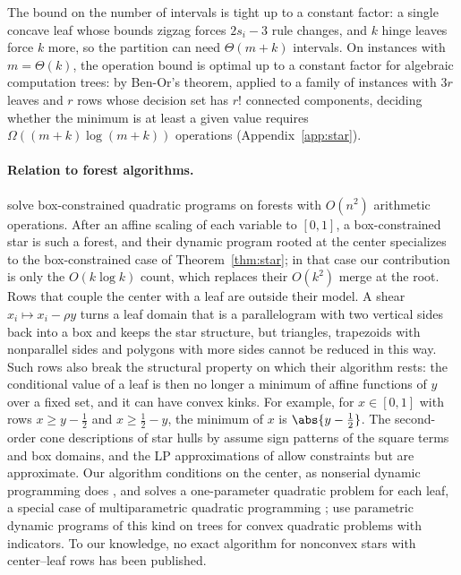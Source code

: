 The bound on the number of intervals is tight up to a constant factor: a
single concave leaf whose bounds zigzag forces $2s_i-3$ rule changes, and $k$
hinge leaves force $k$ more, so the partition can need $\Theta(m+k)$
intervals. On instances with $m=\Theta(k)$, the operation bound is optimal up
to a constant factor for algebraic computation trees: by Ben-Or's theorem,
applied to a family of instances with $3r$ leaves and $r$ rows whose decision
set has $r!$ connected components, deciding whether the minimum is at least a
given value requires $\Omega((m+k)\log(m+k))$ operations
(Appendix~\ref{app:star}).

\paragraph{Relation to forest algorithms.}
\citet{DelPiaKhajavirad2026} solve box-constrained quadratic programs on
forests with $O(n^2)$ arithmetic operations. After an affine scaling of each
variable to $[0,1]$, a box-constrained star is such a forest, and their
dynamic program rooted at the center specializes to the box-constrained case
of Theorem~\ref{thm:star}; in that case our contribution is only the
$O(k\log k)$ count, which replaces their $O(k^2)$ merge at the root. Rows
that couple the center with a leaf are outside their model. A shear
$x_i\mapsto x_i-\rho y$ turns a leaf domain that is a parallelogram with two
vertical sides back into a box and keeps the star structure, but triangles,
trapezoids with nonparallel sides and polygons with more sides cannot be
reduced in this way. Such rows also break the structural property on which
their algorithm rests: the conditional value of a leaf is then no longer a
minimum of affine functions of $y$ over a fixed set, and it can have convex
kinks. For example, for $x\in[0,1]$ with rows $x\ge y-\tfrac12$ and
$x\ge\tfrac12-y$, the minimum of $x$ is $\abs{y-\tfrac12}$. The second-order
cone descriptions of star hulls by \citet{DeyKhajavirad2025} assume sign patterns
of the square terms and box domains, and the LP approximations of
\citet{BienstockMunoz2018} allow constraints but are approximate. Our
algorithm conditions on the center, as nonserial dynamic programming does
\citep{BerteleBrioschi1972}, and solves a one-parameter quadratic problem for
each leaf, a special case of multiparametric quadratic programming
\citep{Bemporad2002}; \citet{BhathenaEtAl2025} use parametric dynamic
programs of this kind on trees for convex quadratic problems with
indicators. To our knowledge, no exact algorithm for nonconvex stars with
center--leaf rows has been published.

